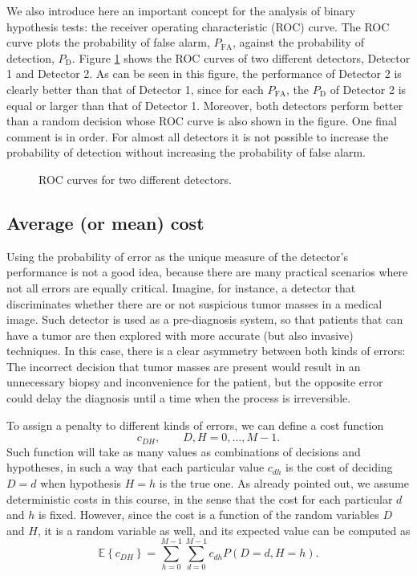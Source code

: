We also introduce here an important concept for the analysis of binary hypothesis tests: the receiver operating characteristic (ROC) curve. The ROC curve plots the probability of false alarm, $P_\text{FA}$, against the probability of detection, $P_\text{D}$. Figure \ref{fig:ROC} shows the ROC curves of two different detectors, Detector 1 and Detector 2. As can be seen in this figure, the performance of Detector 2 is clearly better than that of Detector 1, since for each $P_\text{FA}$, the $P_\text{D}$ of Detector 2 is equal or larger than that of Detector 1. Moreover, both detectors perform better than a random decision whose ROC curve is also shown in the figure. One final comment is in order. For almost all detectors it is not possible to increase the probability of detection without increasing the probability of false alarm.

\begin{figure}
        \begin{center}
			
	\end{center}
	\caption{ROC curves for two different detectors.\label{fig:ROC}}
\end{figure}

\subsection{Average (or mean) cost}

Using the probability of error as the unique measure of the detector's performance is not a good idea, because there are many practical scenarios where not all errors are equally critical. Imagine, for instance, a detector that discriminates whether there are or not suspicious tumor masses in a medical image. Such detector is used as a pre-diagnosis system, so that patients that can have a tumor are then explored with more accurate (but also invasive) techniques. In this case, there is a clear asymmetry between both kinds of errors: The incorrect decision that tumor masses are present would result in an unnecessary biopsy and inconvenience for the patient, but the opposite error could delay the diagnosis until a time when the process is irreversible.

To assign a penalty to different kinds of errors, we can define a cost function $$c_{DH}, \qquad D,H = 0, \ldots, M-1.$$ Such function will take as many values as combinations of decisions and hypotheses, in such a way that each particular value $c_{dh}$ is the cost of deciding $D=d$ when hypothesis $H=h$ is the true one. As already pointed out, we assume deterministic costs in this course, in the sense that the cost for each particular $d$ and $h$ is fixed. However, since the cost is a function of the random variables $D$ and $H$, it is a random variable as well, and its expected value can be computed as
$$\mathbb{E}\left\{ c_{DH}\right\} = \sum_{h=0}^{M-1} \sum_{d=0}^{M-1} c_{dh} P(D=d, H=h).$$

